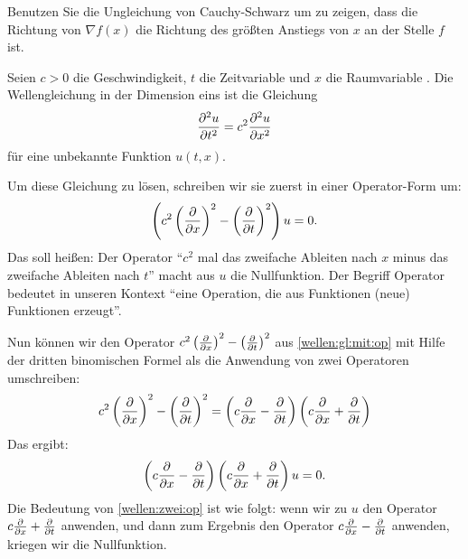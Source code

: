\begin{aufg}
	Benutzen Sie die Ungleichung von Cauchy-Schwarz um zu zeigen, dass die  Richtung von $\nabla f(x)$ die Richtung des größten Anstiegs von $x$ an der Stelle $f$ ist. 
\end{aufg} 


\begin{bem}
	Seien $c>0$ die Geschwindigkeit, $t$ die Zeitvariable und $x$ die Raumvariable . Die Wellengleichung in der Dimension eins ist die Gleichung 
	\[
		 \frac{\partial^2 u}{\partial t^2} =   c^2 \frac{\partial^2 u}{\partial x^2} 
	\]
	für eine unbekannte Funktion $u(t,x)$. 
	
	Um diese Gleichung zu lösen, schreiben wir sie zuerst in einer Operator-Form um: 
	\begin{align} \label{wellen:gl:mit:op} 
		\left( c^2 \left( \frac{\partial }{\partial x} \right)^2 -  \left( \frac{\partial }{\partial t} \right)^2 \right) u = 0. 
	\end{align}
	Das soll heißen: Der Operator ``$c^2$ mal das zweifache Ableiten nach $x$ minus das zweifache Ableiten nach $t$'' macht aus $u$ die Nullfunktion.  Der Begriff Operator bedeutet in unseren Kontext ``eine Operation, die aus Funktionen (neue) Funktionen erzeugt''. 
		
	Nun können wir den Operator $c^2 \left( \frac{\partial }{\partial x} \right)^2 -  \left( \frac{\partial }{\partial t} \right)^2$ aus \eqref{wellen:gl:mit:op} mit Hilfe der dritten binomischen Formel als die Anwendung von zwei Operatoren umschreiben: 
	\[
		 c^2 \left(  \frac{\partial }{\partial x} \right)^2 - \left( \frac{\partial }{\partial t} \right)^2 = \left( c \frac{\partial }{\partial x} -   \frac{\partial }{\partial t}   \right) \left(  c \frac{\partial }{\partial x}  +  \frac{\partial }{\partial t}  \right) 
	\]
	Das ergibt: 
	\begin{align} \label{wellen:zwei:op}
		\left( c \frac{\partial }{\partial x} - \frac{\partial }{\partial t}   \right) \left(   c \frac{\partial }{\partial x} + \frac{\partial }{\partial t} \right) u = 0. 
	\end{align}
	Die Bedeutung von \eqref{wellen:zwei:op} ist wie folgt: wenn wir zu $u$ den Operator $  c \frac{\partial }{\partial x}  + \frac{\partial }{\partial t}$ anwenden, und dann zum Ergebnis den Operator $ c \frac{\partial }{\partial x}  - \frac{\partial }{\partial t}$ anwenden, kriegen wir die Nullfunktion. 
	

\end{bem}
